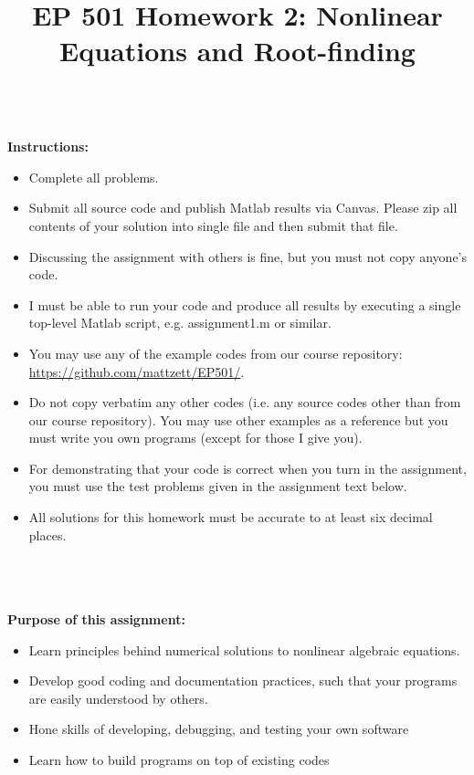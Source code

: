 \documentclass{article}
\begin{document}
\title{EP 501 Homework 2:  Nonlinear Equations and Root-finding}

\maketitle

~\\
\textbf{Instructions:}  
\begin{itemize}
  \item Complete all problems.
  \item Submit all source code and publish Matlab results via Canvas.  Please zip all contents of your solution into single file and then submit that file.    
  \item Discussing the assignment with others is fine, but you must not copy anyone's code.  
  \item I must be able to run your code and produce all results by executing a single top-level Matlab script, e.g. \textsf{assignment1.m} or similar.  
  \item You may use any of the example codes from our course repository:  \url{https://github.com/mattzett/EP501/}.
  \item Do not copy verbatim any other codes (i.e. any source codes other than from our course repository).  You may use other examples as a reference but you must write you own programs (except for those I give you).  
    \item For demonstrating that your code is correct when you turn in the assignment, you must use the test problems given in the assignment text below.  
    \item  All solutions for this homework must be accurate to at least six decimal places.  

\end{itemize}
~\\~\\~\\
\textbf{Purpose of this assignment:}  
\begin{itemize}
  \item Learn principles behind numerical solutions to nonlinear algebraic equations.  
  \item Develop good coding and documentation practices, such that your programs are easily understood by others.  
  \item Hone skills of developing, debugging, and testing your own software
  \item Learn how to build programs on top of existing codes
\end{itemize}
\end{document}
